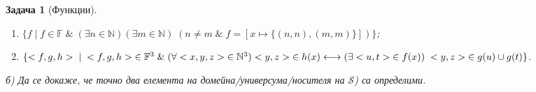 \documentclass[12pt]{article}
\newtheorem{problem}{Задача}%
\begin{document}
\begin{problem}[Функции]
\begin{enumerate}
\item \(\{f \; | \; f \in \mathbb{F} \; \& \; (\exists n \in \mathbb{N})(\exists m \in \mathbb{N}) \; (n \neq m \; \& \; f = [x \mapsto \{(n, n), (m, m)\}] )\}\);

\item \(\{<f, g, h> \; | \; <f, g, h> \; \in \mathbb{F}^3 \; \& \; (\forall <x, y, z> \; \in \mathbb{N}^3) \\
<y, z> \; \in h(x) \longleftrightarrow (\exists <u, t> \; \in f(x)) \; <y, z> \; \in g(u) \cup g(t) \}\).
\end{enumerate}

б) Да се докаже, че точно два елемента на домейна/универсума/носителя на \(\mathcal{S}\)) са определими.
    
\end{problem}
\end{document}
